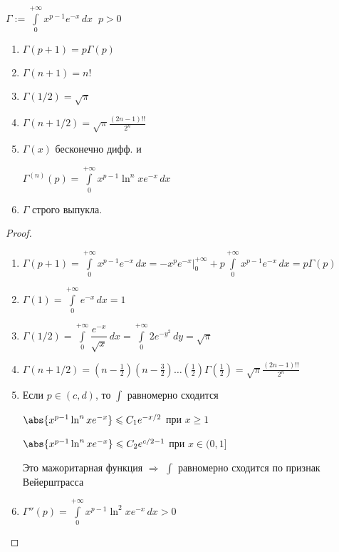 \begin{definition}\thmslashn
	
	$\Gamma := \int\limits_{0}^{+\infty} x^{p-1}e^{-x}\,dx \;\; p > 0$
	
\end{definition}

\begin{properties}\thmslashn
	
	\begin{enumerate}
		\item 
		$\Gamma(p+1) = p \Gamma(p)$
		\item 
		$\Gamma(n+1) = n!$
		\item 
		$\Gamma(1/2) = \sqrt{\pi}$
		\item 
		$\Gamma(n + 1/2) = \sqrt{\pi}\frac{(2n-1)!!}{2^n}$
		\item 
		$\Gamma(x)$ бесконечно дифф.  и 
		
		$\Gamma^{(n)}(p) = \int\limits_{0}^{+\infty} x^{p-1} \ln^n x e^{-x} \,dx$
		\item 
		$\Gamma$ строго выпукла.
	\end{enumerate}
	
\end{properties}

\begin{proof}\thmslashn
	
	\begin{enumerate}
		\item 
		$\Gamma(p+1) = \int\limits_{0}^{+\infty} x^{p-1}e^{-x}\,dx = -x^pe^{-x}\Big|_{0}^{+\infty} +  p \int\limits_{0}^{+\infty} x^{p-1}e^{-x}\,dx = p\Gamma(p)$
		\item 
		$\Gamma(1) = \int\limits_{0}^{+\infty} e^{-x}\,dx = 1$
		\item 
		$\Gamma(1/2) = \int\limits_{0}^{+\infty} \dfrac{e^{-x}}{\sqrt{x}}\,dx = \int\limits_{0}^{+\infty} 2e^{-y^2}\,dy = \sqrt{\pi}$
		\item 
		$\Gamma(n + 1/2) = \left(n-\frac{1}{2} \right)\left(n-\frac{3}{2} \right)\ldots \left(\frac{1}{2} \right) \Gamma\left(\frac{1}{2}\right) = \sqrt{\pi}\frac{(2n-1)!!}{2^n}$
		\item 
		Если $p \in (c, d)$, то $\int$ равномерно сходится 
		
		$\abs{x^{p-1} \ln^n x e^{-x}} \leqslant C_1e^{-x/2}$ при $x \geqslant 1$
		
		$\abs{x^{p-1} \ln^n x e^{-x}} \leqslant C_2e^{c/2-1}$ при $x \in (0, 1]$
		
		Это мажоритарная функция $\Rightarrow$ $\int$ равномерно сходится по признак Вейерштрасса
		\item 
		$\Gamma''(p) =  \int\limits_{0}^{+\infty} x^{p-1} \ln^2 x e^{-x} \,dx > 0$
	\end{enumerate}
	
\end{proof}